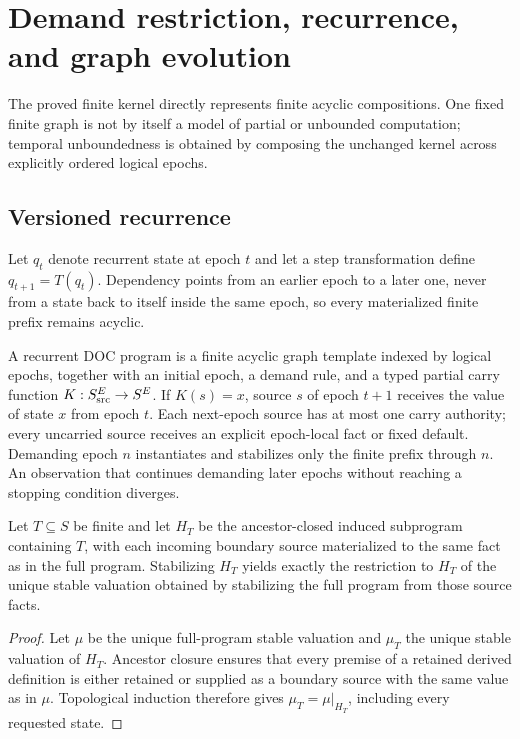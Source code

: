 \section{Demand restriction, recurrence, and graph evolution}\label{sec:extensions}
The proved finite kernel directly represents finite acyclic compositions. One fixed finite graph is not by itself a model of partial or unbounded computation; temporal unboundedness is obtained by composing the unchanged kernel across explicitly ordered logical epochs.

\subsection{Versioned recurrence}
Let $q_t$ denote recurrent state at epoch $t$ and let a step transformation define $q_{t+1}=T(q_t)$. Dependency points from an earlier epoch to a later one, never from a state back to itself inside the same epoch, so every materialized finite prefix remains acyclic.

\begin{definition}\label{def:recurrence}
A recurrent DOC program is a finite acyclic graph template indexed by logical epochs, together with an initial epoch, a demand rule, and a typed partial carry function $K:S^E_{\mathrm{src}}\to S^E$. If $K(s)=x$, source $s$ of epoch $t+1$ receives the value of state $x$ from epoch $t$. Each next-epoch source has at most one carry authority; every uncarried source receives an explicit epoch-local fact or fixed default. Demanding epoch $n$ instantiates and stabilizes only the finite prefix through $n$. An observation that continues demanding later epochs without reaching a stopping condition diverges.
\end{definition}

\begin{theorem}\label{thm:demand}
Let $T\subseteq S$ be finite and let $H_T$ be the ancestor-closed induced subprogram containing $T$, with each incoming boundary source materialized to the same fact as in the full program. Stabilizing $H_T$ yields exactly the restriction to $H_T$ of the unique stable valuation obtained by stabilizing the full program from those source facts.
\end{theorem}
\begin{proof}
Let $\mu$ be the unique full-program stable valuation and $\mu_T$ the unique stable valuation of $H_T$. Ancestor closure ensures that every premise of a retained derived definition is either retained or supplied as a boundary source with the same value as in $\mu$. Topological induction therefore gives $\mu_T=\mu|_{H_T}$, including every requested state.
\end{proof}

